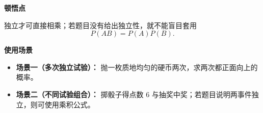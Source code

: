 \begin{explanationbox}
	\medskip

	\textbf{\textcolor{CExplanation}{顿悟点}}

	独立才可直接相乘；若题目没有给出独立性，就不能盲目套用
	\[
		P(AB)=P(A)P(B).
	\]

	\medskip

	\textbf{\textcolor{CExplanation}{使用场景}}

	\begin{itemize}[leftmargin=*, itemsep=0.5em, topsep=0.4em]
		\item \textbf{场景一（多次独立试验）：}
		      抛一枚质地均匀的硬币两次，求两次都正面向上的概率。

		\item \textbf{场景二（不同试验组合）：}
		      掷骰子得点数 $6$ 与抽奖中奖；若题目说明两事件独立，则可使用乘积公式。
	\end{itemize}

\end{explanationbox}